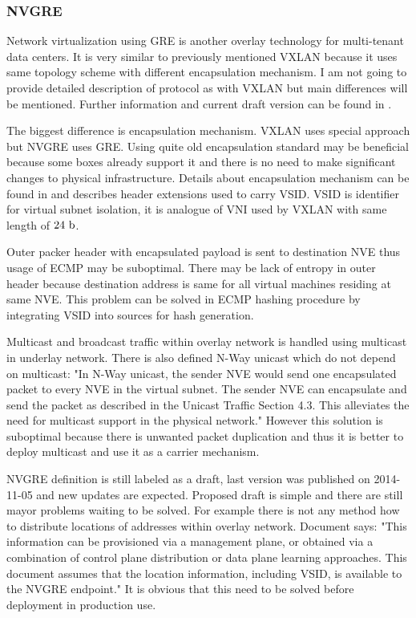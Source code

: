 \subsubsection{NVGRE}
Network virtualization using \Ac{GRE} is another overlay technology for multi-tenant data centers. It is very similar to previously mentioned \Ac{VXLAN} because it uses same topology scheme with different encapsulation mechanism. I am not going to provide detailed description of protocol as with \Ac{VXLAN} but main differences will be mentioned. Further information and current draft version can be found in \cite{draft-nvgre}\cite{rfc2748}\cite{rfc2890}.

The biggest difference is encapsulation mechanism. \Ac{VXLAN} uses special approach but \Ac{NVGRE} uses \Ac{GRE}.  Using quite old encapsulation standard may be beneficial because some boxes already support it and there is no need to make significant changes to physical infrastructure. Details about encapsulation mechanism can be found in \cite{rfc2748} and \cite{rfc2890} describes header extensions used to carry \Ac{VSID}. \Ac{VSID} is identifier for virtual subnet isolation, it is analogue of \Ac{VNI} used by \Ac{VXLAN} with same length of $24~\mathrm{b}$.

Outer packer header with encapsulated payload is sent to destination \Ac{NVE} thus usage of \Ac{ECMP} may be suboptimal. There may be lack of entropy in outer header because destination address is same for all virtual machines residing at same \Ac{NVE}. This problem can be solved in \Ac{ECMP} hashing procedure by integrating \Ac{VSID} into sources for hash generation.

Multicast and broadcast traffic within overlay network is handled using multicast in underlay network. There is also defined N-Way unicast which do not depend on multicast: "In N-Way unicast, the sender NVE would send one encapsulated packet to every NVE in the virtual subnet. The sender NVE can encapsulate and send the packet as described in the Unicast Traffic Section 4.3. This alleviates the need for multicast support in the physical network." \cite{draft-nvgre}
However this solution is suboptimal because there is unwanted packet duplication and thus it is better to deploy multicast and use it as a carrier mechanism.

\Ac{NVGRE} definition \cite{draft-nvgre} is still labeled as a draft, last version was published on 2014-11-05 and new updates are expected. Proposed draft is  simple and there are still mayor problems waiting to be solved. For example there is not any method how to distribute locations of addresses within overlay network. Document \cite{draft-nvgre} says: "This information can be provisioned via a management plane, or obtained via a combination of control plane distribution or data plane learning approaches. This document assumes that the location information, including VSID, is available to the NVGRE endpoint." It is obvious that this need to be solved before deployment in production use. 

